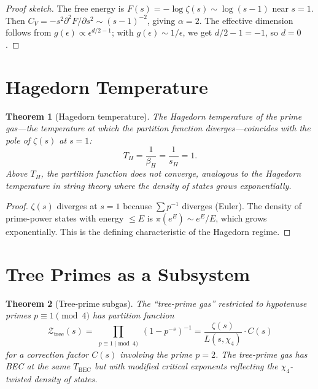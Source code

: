 \documentclass[12pt]{amsart}
\newtheorem{theorem}{Theorem}[section]
\theoremstyle{definition}
\theoremstyle{remark}
\begin{document}
\begin{proof}[Proof sketch]
The free energy is $F(s) = -\log \zeta(s) \sim \log(s-1)$ near $s = 1$.
Then $C_V = -s^2 \partial^2 F / \partial s^2 \sim (s-1)^{-2}$, giving
$\alpha = 2$. The effective dimension follows from $g(\epsilon) \propto
\epsilon^{d/2-1}$; with $g(\epsilon) \sim 1/\epsilon$, we get $d/2 - 1 = -1$,
so $d = 0$.
\end{proof}

\section{Hagedorn Temperature}\label{sec:hagedorn}

\begin{theorem}[Hagedorn temperature]\label{thm:hagedorn}
The Hagedorn temperature of the prime gas---the temperature at which the
partition function diverges---coincides with the pole of $\zeta(s)$ at $s = 1$:
\[
  T_H = \frac{1}{\beta_H} = \frac{1}{s_H} = 1.
\]
Above $T_H$, the partition function does not converge, analogous to the
Hagedorn temperature in string theory where the density of states grows
exponentially.
\end{theorem}

\begin{proof}
$\zeta(s)$ diverges at $s = 1$ because $\sum p^{-1}$ diverges (Euler).
The density of prime-power states with energy $\le E$ is
$\pi(e^E) \sim e^E/E$, which grows exponentially. This is the defining
characteristic of the Hagedorn regime.
\end{proof}

\section{Tree Primes as a Subsystem}\label{sec:subsystem}

\begin{theorem}[Tree-prime subgas]\label{thm:subgas}
The ``tree-prime gas'' restricted to hypotenuse primes $p \equiv 1 \pmod{4}$
has partition function
\[
  \mathcal{Z}_{\mathrm{tree}}(s) = \prod_{\substack{p \equiv 1 \pmod{4}}}
    (1 - p^{-s})^{-1}
  = \frac{\zeta(s)}{L(s, \chi_4)} \cdot C(s)
\]
for a correction factor $C(s)$ involving the prime $p = 2$. The tree-prime
gas has BEC at the same $T_{\mathrm{BEC}}$ but with modified critical
exponents reflecting the $\chi_4$-twisted density of states.
\end{theorem}
\end{document}
